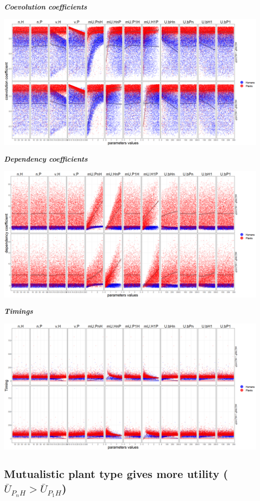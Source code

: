 \documentclass[]{book}
\begin{document}
\textbf{\emph{Coevolution coefficients}}

\includegraphics[width=1\linewidth]{plots/5_multiplePar-coevo-humanImprove-ggplot}

\textbf{\emph{Dependency coefficients}}

\includegraphics[width=1\linewidth]{plots/5_multiplePar-depend-humanImprove-ggplot}

\textbf{\emph{Timings}}

\includegraphics[width=1\linewidth]{plots/5_multiplePar-timing-humanImprove-ggplot}

\newpage

\hypertarget{mutualistic-plant-type-gives-more-utility-baru_p_nh-baru_p_1h}{%
\subsection{\texorpdfstring{Mutualistic plant type gives more utility (\(\bar{U}_{P_{n}H}> \bar{U}_{P_{1}H}\))}{Mutualistic plant type gives more utility (\textbackslash{}bar\{U\}\_\{P\_\{n\}H\}\textgreater{} \textbackslash{}bar\{U\}\_\{P\_\{1\}H\})}}\label{mutualistic-plant-type-gives-more-utility-baru_p_nh-baru_p_1h}}
\end{document}
